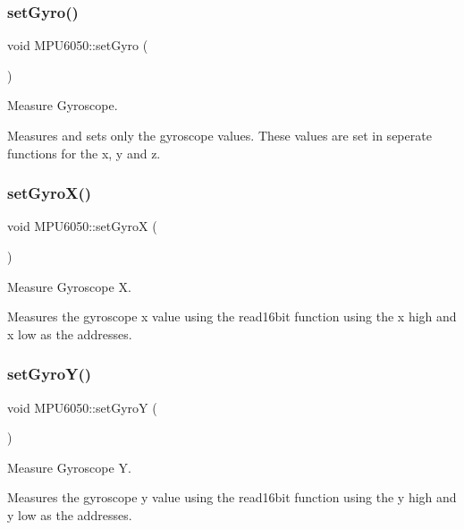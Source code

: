 \subsubsection{\texorpdfstring{set\+Gyro()}{setGyro()}}
{\footnotesize\ttfamily void M\+P\+U6050\+::set\+Gyro (\begin{DoxyParamCaption}{ }\end{DoxyParamCaption})}



Measure Gyroscope. 

Measures and sets only the gyroscope values. These values are set in seperate functions for the x, y and z. \mbox{\label{class_m_p_u6050_a46b0b1dc134fd76791f84b577c4cf4d2}} 
\subsubsection{\texorpdfstring{set\+Gyro\+X()}{setGyroX()}}
{\footnotesize\ttfamily void M\+P\+U6050\+::set\+GyroX (\begin{DoxyParamCaption}{ }\end{DoxyParamCaption})}



Measure Gyroscope X. 

Measures the gyroscope x value using the read16bit function using the x high and x low as the addresses. \mbox{\label{class_m_p_u6050_aeaf72bc3ae93a553221dbbc0a2aaa3c4}} 
\subsubsection{\texorpdfstring{set\+Gyro\+Y()}{setGyroY()}}
{\footnotesize\ttfamily void M\+P\+U6050\+::set\+GyroY (\begin{DoxyParamCaption}{ }\end{DoxyParamCaption})}



Measure Gyroscope Y. 

Measures the gyroscope y value using the read16bit function using the y high and y low as the addresses. \mbox{\label{class_m_p_u6050_a710f9cf1589d8e4dcd26bc5e3bc55e66}} 
